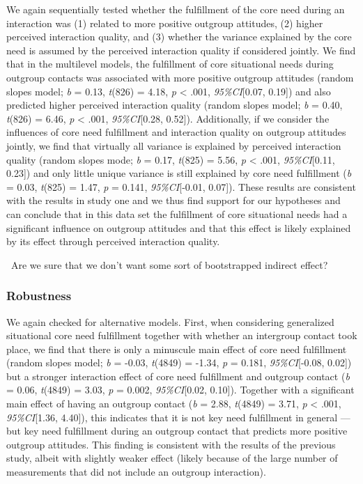We again sequentially tested whether the fulfillment of the core need
during an interaction was (1) related to more positive outgroup
attitudes, (2) higher perceived interaction quality, and (3) whether the
variance explained by the core need is assumed by the perceived
interaction quality if considered jointly. We find that in the
multilevel models, the fulfillment of core situational needs during
outgroup contacts was associated with more positive outgroup attitudes
(random slopes model; \textit{b} = 0.13, \textit{t}(826) = 4.18,
\textit{p} \textless{} .001, \textit{95\%CI}{[}0.07, 0.19{]}) and also
predicted higher perceived interaction quality (random slopes model;
\textit{b} = 0.40, \textit{t}(826) = 6.46, \textit{p} \textless{} .001,
\textit{95\%CI}{[}0.28, 0.52{]}). Additionally, if we consider the
influences of core need fulfillment and interaction quality on outgroup
attitudes jointly, we find that virtually all variance is explained by
perceived interaction quality (random slopes mode; \textit{b} = 0.17,
\textit{t}(825) = 5.56, \textit{p} \textless{} .001,
\textit{95\%CI}{[}0.11, 0.23{]}) and only little unique variance is
still explained by core need fulfillment (\textit{b} = 0.03,
\textit{t}(825) = 1.47, \textit{p} = 0.141, \textit{95\%CI}{[}-0.01,
0.07{]}). These results are consistent with the results in study one and
we thus find support for our hypotheses and can conclude that in this
data set the fulfillment of core situational needs had a significant
influence on outgroup attitudes and that this effect is likely explained
by its effect through perceived interaction quality.

\faQuestionCircle~Are we sure that we don't want some sort of
bootstrapped indirect effect?

\subsubsection{Robustness}

We again checked for alternative models. First, when considering
generalized situational core need fulfillment together with whether an
intergroup contact took place, we find that there is only a minuscule
main effect of core need fulfillment (random slopes model; \textit{b} =
-0.03, \textit{t}(4849) = -1.34, \textit{p} = 0.181,
\textit{95\%CI}{[}-0.08, 0.02{]}) but a stronger interaction effect of
core need fulfillment and outgroup contact (\textit{b} = 0.06,
\textit{t}(4849) = 3.03, \textit{p} = 0.002, \textit{95\%CI}{[}0.02,
0.10{]}). Together with a significant main effect of having an outgroup
contact (\textit{b} = 2.88, \textit{t}(4849) = 3.71, \textit{p}
\textless{} .001, \textit{95\%CI}{[}1.36, 4.40{]}), this indicates that
it is not key need fulfillment in general --- but key need fulfillment
during an outgroup contact that predicts more positive outgroup
attitudes. This finding is consistent with the results of the previous
study, albeit with slightly weaker effect (likely because of the large
number of measurements that did not include an outgroup interaction).

